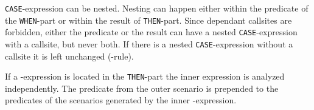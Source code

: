 \texttt{CASE}-expression can be nested. Nesting can happen either within the predicate of the \texttt{WHEN}-part or within the result of \texttt{THEN}-part. Since dependant callsites are forbidden, either the predicate or the result can have a nested \texttt{CASE}-expression with a callsite, but never both. If there is a nested \texttt{CASE}-expression without a callsite it is left unchanged (\RBASE-rule).

If a \CASE-expression is located in the \texttt{THEN}-part the inner expression is analyzed independently. The predicate from the outer scenario is prepended to the predicates of the scenarios generated by the inner \CASE-expression.

